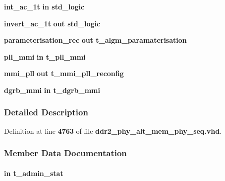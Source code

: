 \begin{DoxyCompactItemize}
{\bf int\+\_\+ac\+\_\+1t}  {\bfseries {\bfseries \textcolor{keywordflow}{in}\textcolor{vhdlchar}{ }}} {\bfseries \textcolor{comment}{std\+\_\+logic}\textcolor{vhdlchar}{ }} 
\item 
{\bf invert\+\_\+ac\+\_\+1t}  {\bfseries {\bfseries \textcolor{keywordflow}{out}\textcolor{vhdlchar}{ }}} {\bfseries \textcolor{comment}{std\+\_\+logic}\textcolor{vhdlchar}{ }} 
\item 
{\bf parameterisation\+\_\+rec}  {\bfseries {\bfseries \textcolor{keywordflow}{out}\textcolor{vhdlchar}{ }}} {\bfseries {\bfseries {\bf t\+\_\+algm\+\_\+paramaterisation}} \textcolor{vhdlchar}{ }} 
\item 
{\bf pll\+\_\+mmi}  {\bfseries {\bfseries \textcolor{keywordflow}{in}\textcolor{vhdlchar}{ }}} {\bfseries {\bfseries {\bf t\+\_\+pll\+\_\+mmi}} \textcolor{vhdlchar}{ }} 
\item 
{\bf mmi\+\_\+pll}  {\bfseries {\bfseries \textcolor{keywordflow}{out}\textcolor{vhdlchar}{ }}} {\bfseries {\bfseries {\bf t\+\_\+mmi\+\_\+pll\+\_\+reconfig}} \textcolor{vhdlchar}{ }} 
\item 
{\bf dgrb\+\_\+mmi}  {\bfseries {\bfseries \textcolor{keywordflow}{in}\textcolor{vhdlchar}{ }}} {\bfseries {\bfseries {\bf t\+\_\+dgrb\+\_\+mmi}} \textcolor{vhdlchar}{ }} 
\end{DoxyCompactItemize}


\subsubsection{Detailed Description}


Definition at line {\bf 4763} of file {\bf ddr2\+\_\+phy\+\_\+alt\+\_\+mem\+\_\+phy\+\_\+seq.\+vhd}.



\subsubsection{Member Data Documentation}
\paragraph[{admin\+\_\+regs\+\_\+status}]{ {\bfseries \textcolor{keywordflow}{in}\textcolor{vhdlchar}{ }} {\bfseries {\bfseries {\bf t\+\_\+admin\+\_\+stat}} \textcolor{vhdlchar}{ }} \hspace{0.3cm}{\ttfamily [Port]}}\label{classddr2__phy__alt__mem__phy__mmi_a0caed76c53c1590cc55d5d1af97dd5d8}


